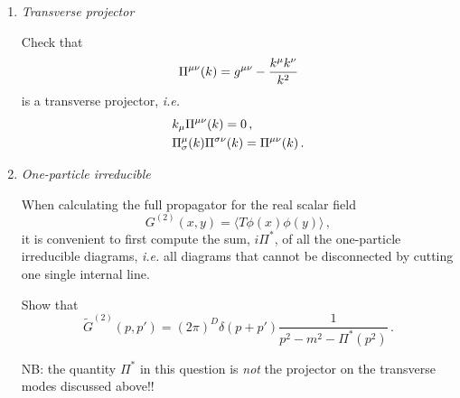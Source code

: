 \documentclass{tutorial}
\begin{document}
\begin{enumerate}
    \bigskip
    
    \item \emph{ Transverse projector}
      
      Check that 
      \[
      \Pi^{\mu\nu}(k) = g^{\mu\nu} - \frac{k^\mu k^\nu}{k^2}
      \]
      is a transverse projector, {\em i.e.}
      \begin{align*}
        & k_\mu \Pi^{\mu\nu}(k) =  0 \, , \\
        & \Pi^\mu_\sigma(k) \Pi^{\sigma\nu}(k) = \Pi^{\mu\nu}(k) \, .
      \end{align*}
      
      \bigskip

    \item \emph{ One-particle irreducible}

      When calculating the full propagator for the real scalar field
      \[
      G^{(2)}(x,y) = \langle T \phi(x) \phi(y) \rangle\, ,
      \]
      it is convenient to first compute the sum, $i\Pi^*$, of all the
      one-particle irreducible diagrams, {\em i.e.} all diagrams that
      cannot be disconnected by cutting one single internal line. 
 
      Show that 
      \[
      \tilde{G}^{(2)}(p,p') = (2\pi)^D \delta(p+p')
      \frac{1}{p^2-m^2-\Pi^*(p^2)}\, .
      \]
      
      NB: the quantity $\Pi^*$ in this question is {\em not} the
      projector on the transverse modes discussed above!!

\end{enumerate}
\end{document}
